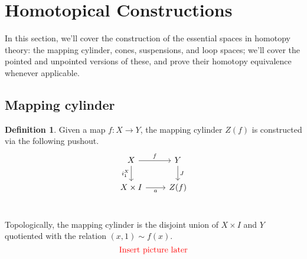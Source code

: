 \documentclass[12pt, notitlepage]{article}
\theoremstyle{definition}
\newtheorem{defn}{Definition}[section]
\begin{document}
\section{Homotopical Constructions}
In this section, we'll cover the construction of the essential spaces in homotopy theory: the mapping cylinder, cones, suspensions, and loop spaces; we'll cover the pointed and unpointed versions of these, and prove their homotopy equivalence whenever applicable.

\subsection{Mapping cylinder}
\begin{defn}
    Given a map $f: X \to Y$, the mapping cylinder $Z(f)$ is constructed via the following pushout.
    \[
    \begin{tikzcd}
    X \ar{r}{f} \ar[swap]{d}{i_1^X} & Y \ar{d}{J} \\
    X \times I \ar[swap]{r}{a} & Z(f) \\
    \end{tikzcd}
    \]
\end{defn}
Topologically, the mapping cylinder is the disjoint union of $X \times I$ and $Y$ quotiented with the relation $(x, 1) \sim f(x)$.
\[
\text{\color{red} Insert picture later}
\]



%
%
\end{document}
